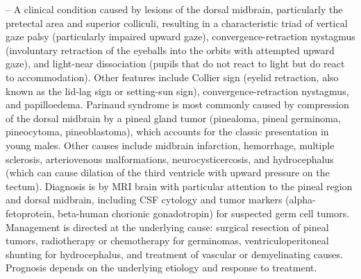 -- A clinical condition caused by lesions of the dorsal midbrain, particularly the pretectal area and superior colliculi, resulting in a characteristic triad of vertical gaze palsy (particularly impaired upward gaze), convergence-retraction nystagmus (involuntary retraction of the eyeballs into the orbits with attempted upward gaze), and light-near dissociation (pupils that do not react to light but do react to accommodation). Other features include Collier sign (eyelid retraction, also known as the lid-lag sign or setting-sun sign), convergence-retraction nystagmus, and papilloedema. Parinaud syndrome is most commonly caused by compression of the dorsal midbrain by a pineal gland tumor (pinealoma, pineal germinoma, pineocytoma, pineoblastoma), which accounts for the classic presentation in young males. Other causes include midbrain infarction, hemorrhage, multiple sclerosis, arteriovenous malformations, neurocysticercosis, and hydrocephalus (which can cause dilation of the third ventricle with upward pressure on the tectum). Diagnosis is by MRI brain with particular attention to the pineal region and dorsal midbrain, including CSF cytology and tumor markers (alpha-fetoprotein, beta-human chorionic gonadotropin) for suspected germ cell tumors. Management is directed at the underlying cause: surgical resection of pineal tumors, radiotherapy or chemotherapy for germinomas, ventriculoperitoneal shunting for hydrocephalus, and treatment of vascular or demyelinating causes. Prognosis depends on the underlying etiology and response to treatment.
